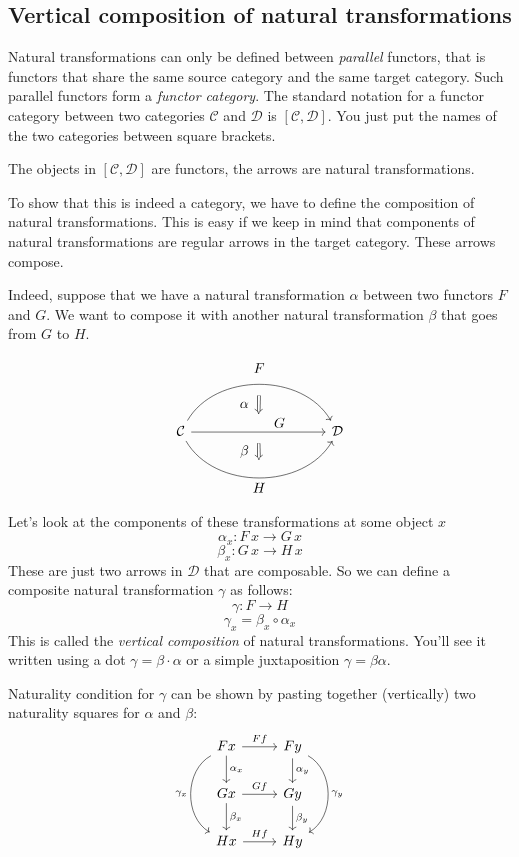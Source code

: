 \documentclass[DaoFP]{subfiles}
\begin{document}
\subsection{Vertical composition of natural transformations}

Natural transformations can only be defined between \emph{parallel} functors, that is functors that share the same source category and the same target category. Such parallel functors form a \emph{functor category}. The standard notation for a functor category between two categories $\mathcal{C}$ and $\mathcal{D}$ is $[\mathcal{C}, \mathcal{D}]$. You just put the names of the two categories between square brackets.

The objects in $[\mathcal{C}, \mathcal{D}]$ are functors, the arrows are natural transformations. 

To show that this is indeed a category, we have to define the composition of natural transformations. This is easy if we keep in mind that components of natural transformations are regular arrows in the target category. These arrows compose.

Indeed, suppose that we have a natural transformation $\alpha$ between two functors $F$ and $G$. We want to compose it with another natural transformation $\beta$ that goes from $G$ to $H$. 

\[
\begin{tikzcd}[column sep=huge]
\mathcal{C}
  \arrow[bend left=60]{rr}[name=U, label=above:$F$]{}
  \arrow[]{rr}[name=M, label={[xshift=15pt, yshift=-5pt]:$G$}]{} 
  \arrow[bend right=60]{rr}[name=D, label=below:$H$]{} 
 &&
\mathcal{D}
  \arrow[shorten <=8pt, shorten >=8pt,Rightarrow, to path={(U) -- node[label=left:$\alpha$] {} (M)}]{}
  \arrow[shorten <=8pt, shorten >=8pt,Rightarrow, to path={(M) -- node[label=left:$\beta$] {} (D)}]{}
\end{tikzcd}
\]


Let's look at the components of these transformations at some object $x$
\[ \alpha_x \colon F \, x \to G \, x \]
\[ \beta_x \colon G \, x \to H \, x \]
These are just two arrows in $\mathcal{D}$ that are composable. So we can define a composite natural transformation $\gamma$ as follows:
\[ \gamma \colon F \to H\]
\[ \gamma_x = \beta_x \circ \alpha_x \]
 This is called the \emph{vertical composition} of natural transformations. You'll see it written using a dot $\gamma = \beta \cdot \alpha$ or a simple juxtaposition $\gamma = \beta \alpha$.
 
Naturality condition for $\gamma$ can be shown by pasting together (vertically) two naturality squares for $\alpha$ and $\beta$:
\[
 \begin{tikzcd}
 F x
 \arrow[d, "\alpha_x"]
 \arrow[r, "F f"]
 \arrow[dd, bend right = 60, "\gamma_x"']
 &
F y
  \arrow[d, "\alpha_y"]
 \arrow[dd, bend left = 60, "\gamma_y"]
 \\
G x
 \arrow[r, "G f"]
 \arrow[d, "\beta_x"]
& G y
\arrow[d, "\beta_y"]
\\
H x
\arrow[r, "H f"]
& H y
 \end{tikzcd}
\]
\end{document}
